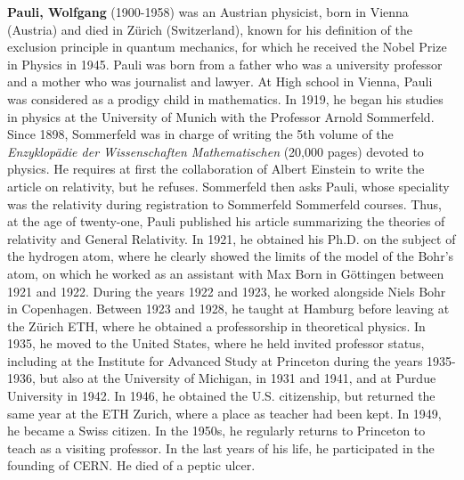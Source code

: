 \textbf{Pauli, Wolfgang} (1900-1958) was an Austrian physicist, born in Vienna (Austria) and died in Zürich (Switzerland), known for his definition of the exclusion principle in quantum mechanics, for which he received the Nobel Prize in Physics in 1945. Pauli was born from a father who was a university professor and a mother who was journalist and lawyer. At High school in Vienna, Pauli was considered as a prodigy child in mathematics. In 1919, he began his studies in physics at the University of Munich with the Professor Arnold Sommerfeld. Since 1898, Sommerfeld was in charge of writing the 5th volume of the \textit{Enzyklopädie der Wissenschaften Mathematischen} (20,000 pages) devoted to physics. He requires at first the collaboration of Albert Einstein to write the article on relativity, but he refuses. Sommerfeld then asks Pauli, whose speciality was the relativity during registration to Sommerfeld Sommerfeld courses. Thus, at the age of twenty-one, Pauli published his article summarizing the theories of relativity and General Relativity. In 1921, he obtained his Ph.D. on the subject of the hydrogen atom, where he clearly showed the limits of the model of the Bohr's atom, on which he worked as an assistant with Max Born in Göttingen between 1921 and 1922. During the years 1922 and 1923, he worked alongside Niels Bohr in Copenhagen. Between 1923 and 1928, he taught at Hamburg before leaving at the Zürich ETH, where he obtained a professorship in theoretical physics. In 1935, he moved to the United States, where he held invited professor status, including at the Institute for Advanced Study at Princeton during the years 1935-1936, but also at the University of Michigan, in 1931 and 1941, and at Purdue University in 1942. In 1946, he obtained the U.S. citizenship, but returned the same year at the ETH Zurich, where a place as teacher had been kept. In 1949, he became a Swiss citizen. In the 1950s, he regularly returns to Princeton to teach as a visiting professor. In the last years of his life, he participated in the founding of CERN. He died of a peptic ulcer.

